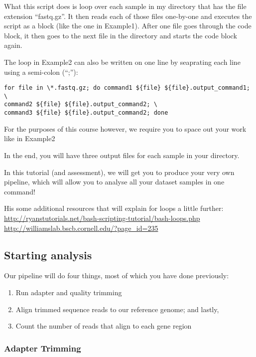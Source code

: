 What this script does is loop over each sample in my directory that has
the file extension ``fastq.gz''. It then reads each of those files
one-by-one and executes the script as a block (like the one in
Example1). After one file goes through the code block, it then goes to
the next file in the directory and starts the code block again.

The loop in Example2 can also be written on one line by seaprating each
line using a semi-colon (``;''):

\begin{verbatim}
for file in \*.fastq.gz; do command1 ${file} ${file}.output_command1; \
command2 ${file} ${file}.output_command2; \
command3 ${file} ${file}.output_command2; done
\end{verbatim}

For the purposes of this course however, we require you to space out
your work like in Example2

In the end, you will have three output files for each sample in your
directory.

In this tutorial (and assessment), we will get you to produce your very
own pipeline, which will allow you to analyse all your dataset samples
in one command!

His some additional resources that will explain for loops a little
further:\\
\url{http://ryanstutorials.net/bash-scripting-tutorial/bash-loops.php}\\
\url{http://williamslab.bscb.cornell.edu/?page_id=235}

\subsection{Starting analysis}\label{starting-analysis}

Our pipeline will do four things, most of which you have done
previously:

\begin{enumerate}
\def\labelenumi{\arabic{enumi}.}
\tightlist
\item
  Run adapter and quality trimming
\item
  Align trimmed sequence reads to our reference genome; and lastly,
\item
  Count the number of reads that align to each gene region
\end{enumerate}

\subsubsection{Adapter Trimming}\label{adapter-trimming}

